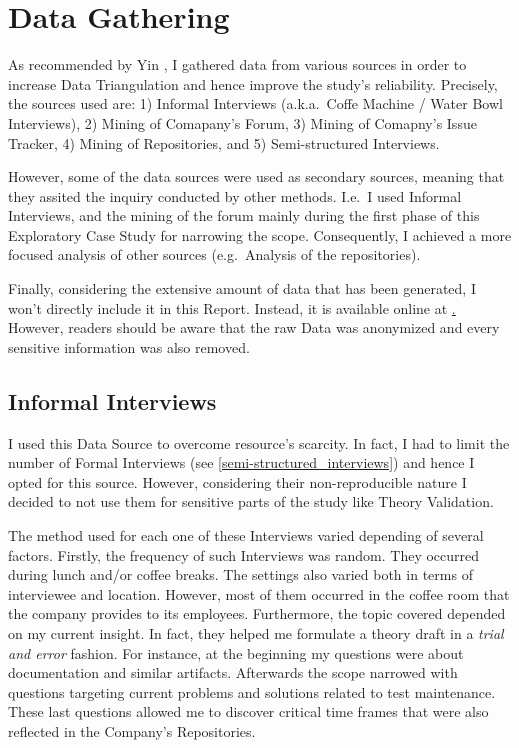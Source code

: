 %
%
%
%

%
%
%
%
\section{Data Gathering}
As recommended by Yin \cite{case_study_guide,case_study_software_engineering}, I gathered data from various sources in order to increase Data Triangulation and hence improve the study's reliability. Precisely, the sources used are: 1) Informal Interviews (a.k.a.\ Coffe Machine / Water Bowl Interviews), 2) Mining of Comapany's Forum, 3) Mining of Comapny's Issue Tracker, 4) Mining of Repositories, and 5) Semi-structured Interviews.

However, some of the data sources were used as secondary sources, meaning that they assited the inquiry conducted by other methods. I.e.\ I used Informal Interviews, and the mining of the forum mainly during the first phase of this Exploratory Case Study for narrowing the scope. Consequently, I achieved a more focused analysis of other sources (e.g.\ Analysis of the repositories).

Finally, considering the extensive amount of data that has been generated, I won't directly include it in this Report. Instead, it is available online at \href{http://somthing/}. However, readers should be aware that the raw Data was anonymized and every sensitive information was also removed. 


\subsection{Informal Interviews}
I used this Data Source to overcome resource's scarcity. In fact, I had to limit the number of Formal Interviews (see \ref{semi-structured_interviews}) and hence I opted for this source. However, considering their non-reproducible nature I decided to not use them for sensitive parts of the study like Theory Validation. 

The method used for each one of these Interviews varied depending of several factors. Firstly, the frequency of such Interviews was random. They occurred during lunch and/or coffee breaks. The settings also varied both in terms of interviewee and location. However, most of them occurred in the coffee room that the company provides to its employees. Furthermore, the topic covered depended on my current insight. In fact, they helped me formulate a theory draft in a \textit{trial and error} fashion. For instance, at the beginning my questions were about documentation and similar artifacts. Afterwards the scope narrowed with questions targeting current problems and solutions related to test maintenance. These last questions allowed me to discover critical time frames that were also reflected in the Company's Repositories.


